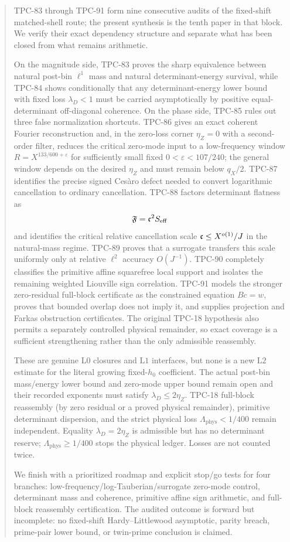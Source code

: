\begin{abstract}
TPC-83 through TPC-91 form nine consecutive audits of the
fixed-shift matched-shell route; the present synthesis is the tenth
paper in that block.  We verify their exact dependency structure and
separate what has been closed from what remains arithmetic.

On the magnitude side, TPC-83 proves the sharp equivalence between
natural post-bin \(\ell^1\) mass and natural determinant-energy
survival, while TPC-84 shows conditionally that any
determinant-energy lower bound with fixed loss \(\lambda_D<1\) must
be carried asymptotically by positive equal-determinant off-diagonal
coherence.  On the phase side,
TPC-85 rules out three false normalization shortcuts.  TPC-86 gives
an exact coherent Fourier reconstruction and, in the zero-loss
corner \(\eta_Z=0\) with a second-order filter, reduces the critical
zero-mode input to a low-frequency window
\(R=X^{133/600+\varepsilon}\) for sufficiently small fixed
\(0<\varepsilon<107/240\); the general window depends on the
desired \(\eta_Z\) and must remain below \(q_X/2\).  TPC-87
identifies the precise signed
Ces\`aro defect needed to convert logarithmic cancellation to
ordinary cancellation.  TPC-88 factors determinant flatness as
\[
 \Flat=\canc^2\Seff
\]
and identifies the critical relative cancellation scale
\(\canc\le X^{o(1)}/J\) in the natural-mass regime.  TPC-89 proves
that a surrogate transfers this scale uniformly only at relative
\(\ell^2\) accuracy \(O(J^{-1})\).  TPC-90 completely classifies the
primitive affine squarefree local support and isolates the remaining
weighted Liouville sign correlation.  TPC-91 models the stronger
zero-residual full-block certificate as the constrained equation
\(Bc=w\), proves that bounded overlap does not imply it, and supplies
projection and Farkas obstruction certificates.  The original
TPC-18 hypothesis also permits a separately controlled physical
remainder, so exact coverage is a sufficient strengthening rather
than the only admissible reassembly.

These are genuine \(\mathrm{L0}\) closures and \(\mathrm{L1}\)
interfaces, but none is a new \(\mathrm{L2}\) estimate for the
literal growing fixed-\(h_0\) coefficient.  The actual post-bin
mass/energy lower bound and zero-mode upper bound remain open and
their recorded exponents must satisfy
\(\lambda_D\le2\eta_Z\).  TPC-18 full-block reassembly
(by zero residual or a proved physical remainder), primitive
determinant dispersion, and the strict physical loss
\(\Lambda_{\mathrm{phys}}<1/400\) remain independent.  Equality
\(\lambda_D=2\eta_Z\) is admissible but has no determinant reserve;
\(\Lambda_{\mathrm{phys}}\ge1/400\) stops the physical ledger.
Losses are not counted twice.

We finish with a prioritized roadmap and explicit stop/go tests for
four branches: low-frequency/log-Tauberian/surrogate zero-mode
control, determinant mass and coherence, primitive affine sign
arithmetic, and full-block reassembly certification.  The audited outcome
is forward but incomplete: no fixed-shift Hardy--Littlewood
asymptotic, parity breach, prime-pair lower bound, or twin-prime
conclusion is claimed.
\end{abstract}

